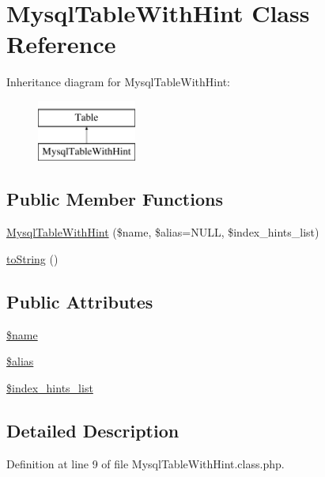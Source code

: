 \hypertarget{classMysqlTableWithHint}{}\section{Mysql\+Table\+With\+Hint Class Reference}
\label{classMysqlTableWithHint}
Inheritance diagram for Mysql\+Table\+With\+Hint\+:\begin{figure}[H]
\begin{center}
\leavevmode
\includegraphics[height=2.000000cm]{classMysqlTableWithHint}
\end{center}
\end{figure}
\subsection*{Public Member Functions}
\begin{DoxyCompactItemize}
\item 
\hyperlink{classMysqlTableWithHint_aa77b8f9ab560a504ab1e24786f77f3a7}{Mysql\+Table\+With\+Hint} (\$name, \$alias=N\+U\+LL, \$index\+\_\+hints\+\_\+list)
\item 
\hyperlink{classMysqlTableWithHint_ad4123d7369e2e100a6189767d3d7e78b}{to\+String} ()
\end{DoxyCompactItemize}
\subsection*{Public Attributes}
\begin{DoxyCompactItemize}
\item 
\hyperlink{classMysqlTableWithHint_a38c6eb1620ea15d06902d2fafb991776}{\$name}
\item 
\hyperlink{classMysqlTableWithHint_a71f2f396bdbde2b55444e8f142c31816}{\$alias}
\item 
\hyperlink{classMysqlTableWithHint_ac389d7382100dd008addab6fbbbe0032}{\$index\+\_\+hints\+\_\+list}
\end{DoxyCompactItemize}


\subsection{Detailed Description}


Definition at line 9 of file Mysql\+Table\+With\+Hint.\+class.\+php.



